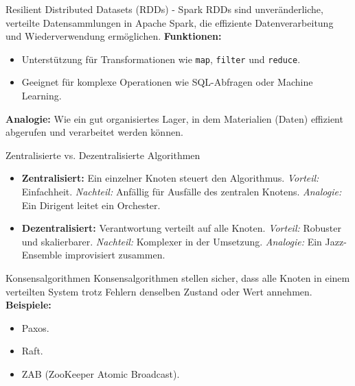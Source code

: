 \documentclass{beamer}
\begin{document}
\begin{frame}{Resilient Distributed Datasets (RDDs) - Spark}
    RDDs sind unveränderliche, verteilte Datensammlungen in Apache Spark, die effiziente Datenverarbeitung und Wiederverwendung ermöglichen. \newline
    \textbf{Funktionen:}
    \begin{itemize}
        \item Unterstützung für Transformationen wie \texttt{map}, \texttt{filter} und \texttt{reduce}.
        \item Geeignet für komplexe Operationen wie SQL-Abfragen oder Machine Learning.
    \end{itemize}
    \textbf{Analogie:} Wie ein gut organisiertes Lager, in dem Materialien (Daten) effizient abgerufen und verarbeitet werden können.
\end{frame}

\begin{frame}{Zentralisierte vs. Dezentralisierte Algorithmen}
    \begin{itemize}
        \item \textbf{Zentralisiert:} Ein einzelner Knoten steuert den Algorithmus. \newline \textit{Vorteil:} Einfachheit. \newline \textit{Nachteil:} Anfällig für Ausfälle des zentralen Knotens. \newline \textit{Analogie:} Ein Dirigent leitet ein Orchester.
        \item \textbf{Dezentralisiert:} Verantwortung verteilt auf alle Knoten. \newline \textit{Vorteil:} Robuster und skalierbarer. \newline \textit{Nachteil:} Komplexer in der Umsetzung. \newline \textit{Analogie:} Ein Jazz-Ensemble improvisiert zusammen.
    \end{itemize}
\end{frame}

\begin{frame}{Konsensalgorithmen}
    Konsensalgorithmen stellen sicher, dass alle Knoten in einem verteilten System trotz Fehlern denselben Zustand oder Wert annehmen. \newline
    \textbf{Beispiele:}
    \begin{itemize}
        \item Paxos.
        \item Raft.
        \item ZAB (ZooKeeper Atomic Broadcast).
    \end{itemize}
\end{frame}
\end{document}

